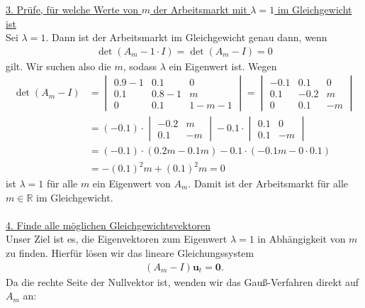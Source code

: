 \underline{3. Prüfe, für welche Werte von $ m $ der Arbeitsmarkt mit $ \lambda = 1 $ im Gleichgewicht ist}\\
Sei $ \lambda = 1 $. Dann ist der Arbeitsmarkt im Gleichgewicht genau dann, wenn 
\begin{align*}
	\det (A_m - 1 \cdot I) = 
	\det (A_m - I) = 0
\end{align*}
gilt. Wir suchen also die $ m $, sodass $ \lambda $ ein Eigenwert ist.
Wegen 
\begin{align*}
	\det (A_m - I)
	&=
	\begin{vmatrix}
		0.9 -1 & 0.1 & 0\\
		0.1 & 0.8 -1 & m\\
		0 & 0.1 & 1-m -1
	\end{vmatrix}
	=
	\begin{vmatrix}
		-0.1 & 0.1 & 0\\
		0.1 & -0.2 & m\\
		0 & 0.1 & -m
	\end{vmatrix}\\
	&=
	(-0.1) \cdot 
	\begin{vmatrix}
		-0.2 & m\\
		0.1 & -m
	\end{vmatrix}
    - 0.1 \cdot
    \begin{vmatrix}
    	0.1 & 0\\
    	0.1 & -m
    \end{vmatrix}\\
	&=
	(-0.1) \cdot 
	(0.2 m - 0.1 m)
	-
	0.1 \cdot
	(-0.1 m  - 0 \cdot 0.1)\\
	&=
	- (0.1)^2 m   + (0.1)^2 m = 0
\end{align*}
ist $ \lambda = 1 $ für alle $ m $ ein Eigenwert von $ A_m $.
Damit ist der Arbeitsmarkt für alle $ m \in \mathbb{R} $ im Gleichgewicht.\\
\\
\underline{4. Finde alle möglichen Gleichgewichtsvektoren}\\
Unser Ziel ist es, die Eigenvektoren zum Eigenwert $ \lambda = 1 $ in Abhängigkeit von $ m $ zu finden.
Hierfür lösen wir das lineare Gleichungssystem
\begin{align*}
	(A_m - I)\textbf{u}_t = \textbf{0}.
\end{align*} 
Da die rechte Seite der Nullvektor ist, wenden wir das Gauß-Verfahren direkt auf $ A_m  $ an:

